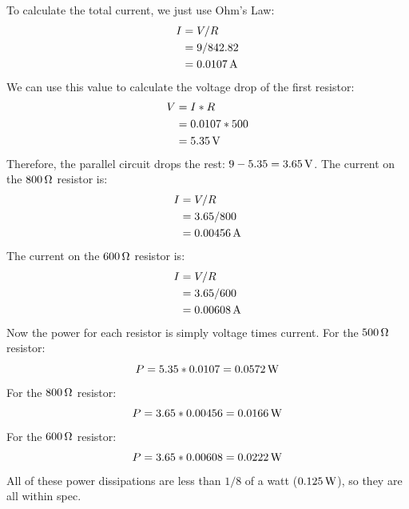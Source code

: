 \begin{enumerate}
{To calculate the total current, we just use Ohm's Law:
\begin{align*}
I &= V / R \\
  &= 9 / 842.82 \\
  &= 0.0107\,\si{\ampere}
\end{align*}
We can use this value to calculate the voltage drop of the first resistor:
\begin{align*}
V &= I * R \\
  &= 0.0107 * 500 \\
  &= 5.35\,\si{\volt}
\end{align*}
Therefore, the parallel circuit drops the rest: $9 - 5.35 = 3.65\,\si{\volt}$.
The current on the $800\,\si{\ohm}$ resistor is:
\begin{align*}
I &= V / R \\
  &= 3.65 / 800 \\
  &= 0.00456 \,\si{\ampere}
\end{align*}
The current on the $600\,\si{\ohm}$ resistor is:
\begin{align*}
I &= V / R \\
  &= 3.65 / 600 \\
  &= 0.00608 \,\si{\ampere}
\end{align*}
Now the power for each resistor is simply voltage times current.
For the $500\,\si{\ohm}$ resistor:
$$ P = 5.35 * 0.0107 = 0.0572 \,\si{\watt} $$
For the $800\,\si{\ohm}$ resistor:
$$ P = 3.65 * 0.00456 = 0.0166 \,\si{\watt} $$
For the $600\,\si{\ohm}$ resistor:
$$ P = 3.65 * 0.00608 = 0.0222 \,\si{\watt} $$
All of these power dissipations are less than $1/8$ of a watt ($0.125\,\si{\watt}$), so they are all within spec.
}
\end{enumerate}
